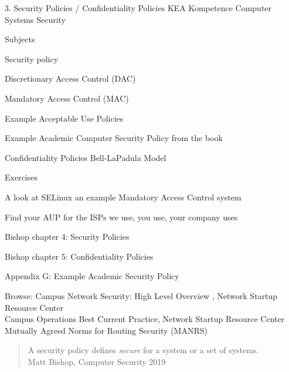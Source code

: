 \documentclass[Screen16to9,17pt]{foils}
\begin{document}
\mytitlepage
{3. Security Policies / Confidentiality Policies}
{KEA Kompetence Computer Systems Security \the\year}



\begin{list1}
\item Subjects
\begin{list2}
  \item Security policy
  \item Discretionary Access Control (DAC)
  \item Mandatory Access Control (MAC)
  \item Example Acceptable Use Policies
  \item Example Academic Computer Security Policy from the book
  \item Confidentiality Policies Bell-LaPadula Model
\end{list2}
\item Exercises
\begin{list2}
\item A look at SELinux an example Mandatory Access Control system
\item Find your AUP for the ISPs we use, you use, your company uses
\end{list2}
\end{list1}


\begin{list1}
\item Bishop chapter 4: Security Policies
\item Bishop chapter 5: Confidentiality Policies
\item Appendix G: Example Academic Security Policy
\item Browse: Campus Network Security: High Level Overview , Network Startup Resource Center\\
Campus Operations Best Current Practice, Network Startup Resource Center\\
Mutually Agreed Norms for Routing Security (MANRS)
\end{list1}



\begin{quote}
A security policy defines \emph{secure} for a system or a set of systems.\\
Matt Bishop, Computer Security 2019
\end{quote}
\end{document}
